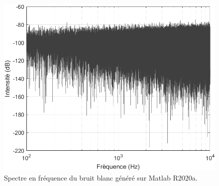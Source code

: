 \documentclass[conference,onecolumn]{IEEEtran}
\begin{document}
    \begin{figure}[H]
        \centering
        \includegraphics[scale=0.5]{img6.png}
        \caption{Spectre en fréquence du bruit blanc généré sur Matlab R2020a.}
    \end{figure}
    
\end{document}
